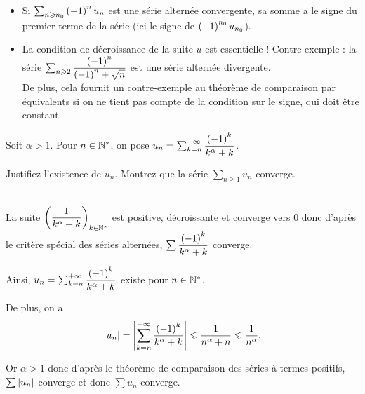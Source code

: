 \begin{rem}
\begin{itemize}
    \item Si \(\sum_{n\geqslant n_0}\left(-1\right)^nu_n\) est une série alternée convergente, sa somme a le signe du premier terme de la série (ici le signe de \(\left(-1\right)^{n_0}u_{n_0}\)). \\
    \item La condition de décroissance de la suite \(u\) est essentielle ! Contre-exemple : la série \(\sum_{n\geqslant2}\dfrac{\left(-1\right)^n}{\left(-1\right)^n+\sqrt{n}}\) est une série alternée divergente. \\ De plus, cela fournit un contre-exemple au théorème de comparaison par équivalents si on ne tient pas compte de la condition sur le signe, qui doit être constant.
\end{itemize}
\end{rem}

\begin{exo}
Soit \(\alpha>1\). Pour \(n\in\mathbb{N}^*\), on pose \(u_n=\sum_{k=n}^{+\infty}\dfrac{\left(-1\right)^k}{k^\alpha+k}\).

Justifiez l'existence de \(u_n\). Montrez que la série \(\sum_{n\geq1}u_n\) converge.
\end{exo}

\begin{corr}~\\
La suite \(\left(\dfrac{1}{k^\alpha+k}\right)_{k\in\mathbb{N}^*}\) est positive, décroissante et converge vers \(0\) donc d'après le critère spécial des séries alternées, \(\sum\dfrac{\left(-1\right)^k}{k^\alpha+k}\) converge.

Ainsi, \(u_n=\sum_{k=n}^{+\infty}\dfrac{\left(-1\right)^k}{k^\alpha+k}\) existe pour \(n\in\mathbb{N}^*\).

De plus, on a \[\left\lvert u_n\right\rvert=\left\lvert\sum_{k=n}^{+\infty}\dfrac{\left(-1\right)^k}{k^\alpha+k}\right\rvert\leqslant\dfrac{1}{n^\alpha+n}\leqslant\dfrac{1}{n^\alpha}.\]

Or \(\alpha>1\) donc d'après le théorème de comparaison des séries à termes positifs, \(\sum\left\lvert u_n\right\rvert\) converge et donc \(\sum u_n\) converge.
\end{corr}
